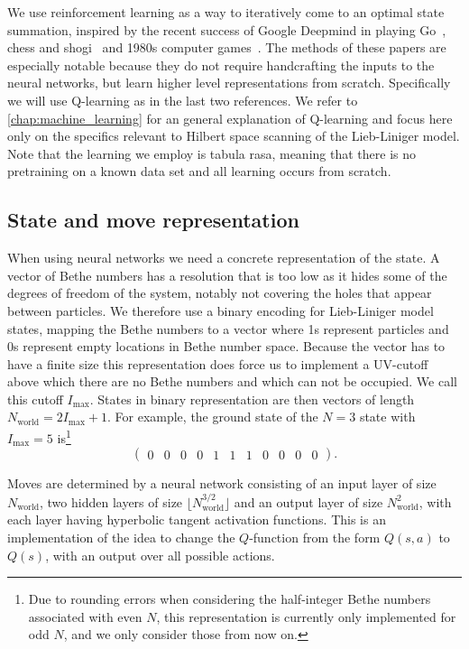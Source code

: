 \documentclass[11pt, a4paper]{report} %
\begin{document}
We use reinforcement learning as a way to iteratively come to an optimal state summation, inspired by the recent success of Google Deepmind in playing Go~\cite{silver16_master_game_go_with_deep,Silver2017a}, chess and shogi~\cite{Silver2017} and 1980s computer games~\cite{mnih13_playin_atari_with_deep_reinf_learn,mnih15_human_level_contr_throug_deep_reinf_learn}.
The methods of these papers are especially notable because they do not require handcrafting the inputs to the neural networks, but learn higher level representations from scratch.
Specifically we will use Q-learning as in the last two references.
We refer to \cref{chap:machine_learning} for an general explanation of Q-learning and focus here only on the specifics relevant to Hilbert space scanning of the Lieb-Liniger model.
Note that the learning we employ is tabula rasa, meaning that there is no pretraining on a known data set and all learning occurs from scratch.

\subsection{State and move representation}

When using neural networks we need a concrete representation of the state.
A vector of Bethe numbers has a resolution that is too low as it hides some of the degrees of freedom of the system, notably not covering the holes that appear between particles.
We therefore use a binary encoding for Lieb-Liniger model states, mapping the Bethe numbers to a vector where 1s represent particles and 0s represent empty locations in Bethe number space.
Because the vector has to have a finite size this representation does force us to implement a UV-cutoff above which there are no Bethe numbers and which can not be occupied.
We call this cutoff \(I_{\max}\).
States in binary representation are then vectors of length $N_{\textrm{world}} = 2 I_{\max} + 1$.
For example, the ground state of the $N=3$ state with $I_{\max} = 5$ is\footnote{Due to rounding errors when considering the half-integer Bethe numbers associated with even \(N\), this representation is currently only implemented for odd \(N\), and we only consider those from now on.}
\begin{equation}
  \label{eq:representation}
  \begin{pmatrix} 0 & 0 & 0 & 0 & 1 & 1 & 1 & 0 & 0 & 0 & 0 \end{pmatrix}.
\end{equation}

Moves are determined by a neural network consisting of an input layer of size \(N_{\textrm{world}}\), two hidden layers of size \(\lfloor N_{\textrm{world}}^{3/2}\rfloor\) and an output layer of size \(N_{\textrm{world}}^2\), with each layer having hyperbolic tangent activation functions.
This is an implementation of the idea to change the \(Q\)-function from the form \(Q(s,a)\) to \(Q(s)\), with an output over all possible actions\cite{mnih15_human_level_contr_throug_deep_reinf_learn,mnih13_playin_atari_with_deep_reinf_learn}.
\end{document}
